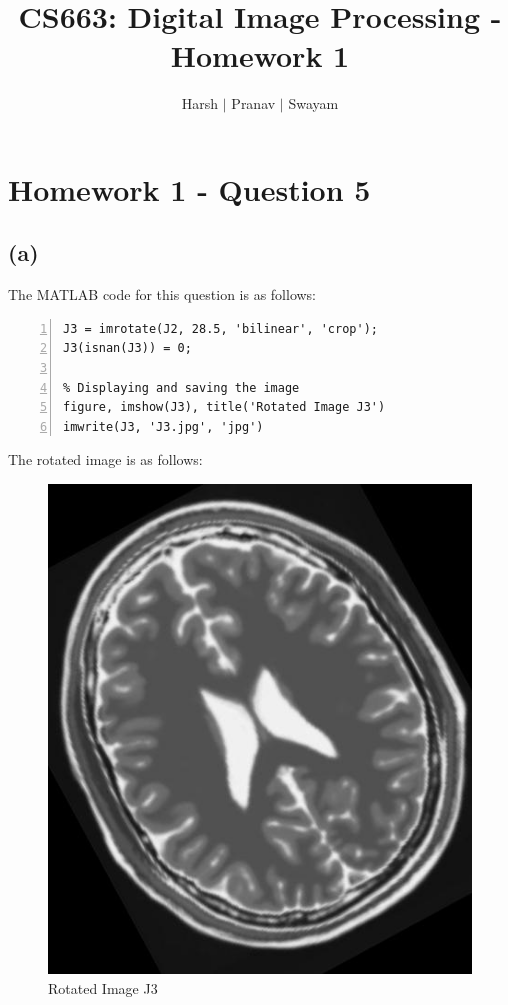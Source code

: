 \documentclass{article}
\title{CS663: Digital Image Processing - Homework 1}
\author{Harsh $\vert$ Pranav $\vert$ Swayam}
\begin{document}
\maketitle
\section{Homework 1 - Question 5}

\subsection*{(a)}

The MATLAB code for this question is as follows:
\begin{lstlisting}[frame=single,numbers=left,style=Matlab-Pyglike]    
J3 = imrotate(J2, 28.5, 'bilinear', 'crop');
J3(isnan(J3)) = 0;

% Displaying and saving the image
figure, imshow(J3), title('Rotated Image J3')
imwrite(J3, 'J3.jpg', 'jpg')
\end{lstlisting}

The rotated image is as follows:
\begin{figure}[H]
\centering
\includegraphics[scale=0.3]{J3.jpg}
\caption{Rotated Image J3}
\end{figure}
\end{document}
